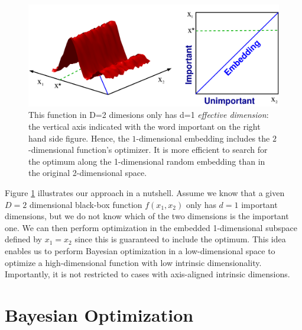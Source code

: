 \documentclass{article}
\begin{document}
\begin{figure}[tb]
  \includegraphics[scale=0.16]{figures/2to1embedding.pdf}
  \centering
  \caption{This function in D=2 dimesions only has d=1 \emph{effective dimension}: the vertical axis indicated with the word important on the right hand side figure. Hence, the $1$-dimensional embedding includes the $2$-dimensional function's optimizer. It is more efficient to search for the optimum along the 1-dimensional random embedding than in the original 2-dimensional space.}
  \label{fig:simple_embedding}
  \vspace*{-4mm}
\end{figure}

Figure \ref{fig:simple_embedding} illustrates our approach in a nutshell.
Assume we know that a given $D=2$ dimensional black-box function $f(x_1, x_2)$ only has $d=1$ important dimensions, but we do not know which of the two dimensions is the important one.
We can then perform optimization in the embedded 1-dimensional subspace defined by $x_1=x_2$ since this is guaranteed to include the optimum. 
This idea enables us to perform Bayesian optimization in a low-dimensional space to
optimize a high-dimensional function with low intrinsic dimensionality. 
Importantly, it is not restricted to cases with axis-aligned intrinsic dimensions.
%
%






\section{Bayesian Optimization}\label{sec:bo}
\end{document}
